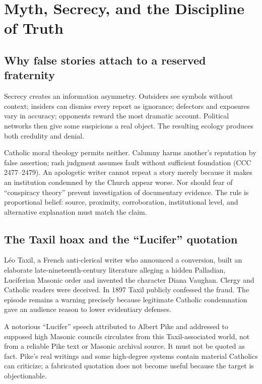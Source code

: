 \section{Myth, Secrecy, and the Discipline of Truth}

\subsection{Why false stories attach to a reserved fraternity}

Secrecy creates an information asymmetry. Outsiders see symbols without context; insiders can dismiss every report as ignorance; defectors and exposures vary in accuracy; opponents reward the most dramatic account. Political networks then give some suspicions a real object. The resulting ecology produces both credulity and denial.

Catholic moral theology permits neither. Calumny harms another's reputation by false assertion; rash judgment assumes fault without sufficient foundation (CCC 2477--2479). An apologetic writer cannot repeat a story merely because it makes an institution condemned by the Church appear worse. Nor should fear of “conspiracy theory” prevent investigation of documentary evidence. The rule is proportional belief: source, proximity, corroboration, institutional level, and alternative explanation must match the claim.

\subsection{The Taxil hoax and the “Lucifer” quotation}

Léo Taxil, a French anti-clerical writer who announced a conversion, built an elaborate late-nineteenth-century literature alleging a hidden Palladian, Luciferian Masonic order and invented the character Diana Vaughan. Clergy and Catholic readers were deceived. In 1897 Taxil publicly confessed the fraud. The episode remains a warning precisely because legitimate Catholic condemnation gave an audience reason to lower evidentiary defenses.

A notorious “Lucifer” speech attributed to Albert Pike and addressed to supposed high Masonic councils circulates from this Taxil-associated world, not from a reliable Pike text or Masonic archival source. It must not be quoted as fact. Pike's real writings and some high-degree systems contain material Catholics can criticize; a fabricated quotation does not become useful because the target is objectionable.

